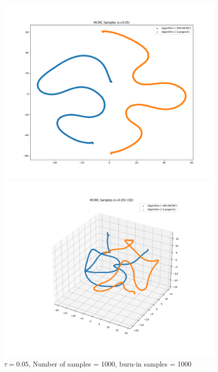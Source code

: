 \documentclass[a4paper,12pt]{article}
\begin{document}
\begin{figure}[H]
  \centering
  \begin{minipage}{0.38\textwidth}
    \includegraphics[width=\linewidth]{TASK-0-1/images/samples_eps0.05_n1000_burn1000_tsne_2d.png}
  \end{minipage}
  \hfill
  \begin{minipage}{0.38\textwidth}
    \includegraphics[width=\linewidth]{TASK-0-1/images/samples_eps0.05_n1000_burn1000_tsne_3d.png}
  \end{minipage}
  \caption{$\tau = 0.05$, Number of samples = 1000, burn-in samples = 1000}
\end{figure}
\end{document}
